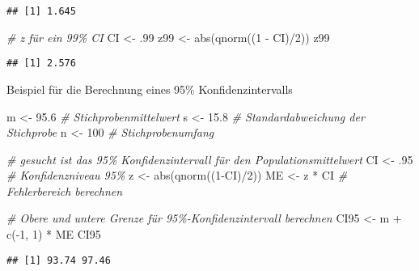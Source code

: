 \documentclass[
]{book}
\newenvironment{Shaded}{\begin{snugshade}}{\end{snugshade}}
\newcommand{\CommentTok}[1]{\textcolor[rgb]{0.56,0.35,0.01}{\textit{#1}}}
\newcommand{\DecValTok}[1]{\textcolor[rgb]{0.00,0.00,0.81}{#1}}
\newcommand{\FloatTok}[1]{\textcolor[rgb]{0.00,0.00,0.81}{#1}}
\newcommand{\FunctionTok}[1]{\textcolor[rgb]{0.00,0.00,0.00}{#1}}
\newcommand{\NormalTok}[1]{#1}
\newcommand{\OtherTok}[1]{\textcolor[rgb]{0.56,0.35,0.01}{#1}}
\newcommand{\SpecialCharTok}[1]{\textcolor[rgb]{0.00,0.00,0.00}{#1}}
\begin{document}
\begin{verbatim}
## [1] 1.645
\end{verbatim}

\begin{Shaded}
\begin{Highlighting}[]
\CommentTok{\# z für ein 99\% CI}
\NormalTok{CI }\OtherTok{\textless{}{-}}\NormalTok{ .}\DecValTok{99}
\NormalTok{z99 }\OtherTok{\textless{}{-}} \FunctionTok{abs}\NormalTok{(}\FunctionTok{qnorm}\NormalTok{((}\DecValTok{1} \SpecialCharTok{{-}}\NormalTok{ CI)}\SpecialCharTok{/}\DecValTok{2}\NormalTok{))}
\NormalTok{z99}
\end{Highlighting}
\end{Shaded}

\begin{verbatim}
## [1] 2.576
\end{verbatim}

Beispiel für die Berechnung eines 95\% Konfidenzintervalls

\begin{Shaded}
\begin{Highlighting}[]
\NormalTok{m }\OtherTok{\textless{}{-}} \FloatTok{95.6}       \CommentTok{\# Stichprobenmittelwert}
\NormalTok{s }\OtherTok{\textless{}{-}} \FloatTok{15.8}       \CommentTok{\# Standardabweichung der Stichprobe}
\NormalTok{n }\OtherTok{\textless{}{-}} \DecValTok{100}        \CommentTok{\# Stichprobenumfang}

\CommentTok{\# gesucht ist das 95\% Konfidenzintervall für den Populationsmittelwert  }
\NormalTok{CI }\OtherTok{\textless{}{-}}\NormalTok{ .}\DecValTok{95}       \CommentTok{\# Konfidenzniveau 95\%}
\NormalTok{z }\OtherTok{\textless{}{-}} \FunctionTok{abs}\NormalTok{(}\FunctionTok{qnorm}\NormalTok{((}\DecValTok{1}\SpecialCharTok{{-}}\NormalTok{CI)}\SpecialCharTok{/}\DecValTok{2}\NormalTok{))}
\NormalTok{ME }\OtherTok{\textless{}{-}}\NormalTok{ z }\SpecialCharTok{*}\NormalTok{ CI    }\CommentTok{\# Fehlerbereich berechnen}

\CommentTok{\# Obere und untere Grenze für 95\%{-}Konfidenzintervall berechnen}
\NormalTok{CI95 }\OtherTok{\textless{}{-}}\NormalTok{ m }\SpecialCharTok{+} \FunctionTok{c}\NormalTok{(}\SpecialCharTok{{-}}\DecValTok{1}\NormalTok{, }\DecValTok{1}\NormalTok{) }\SpecialCharTok{*}\NormalTok{ ME}
\NormalTok{CI95}
\end{Highlighting}
\end{Shaded}

\begin{verbatim}
## [1] 93.74 97.46
\end{verbatim}
\end{document}
